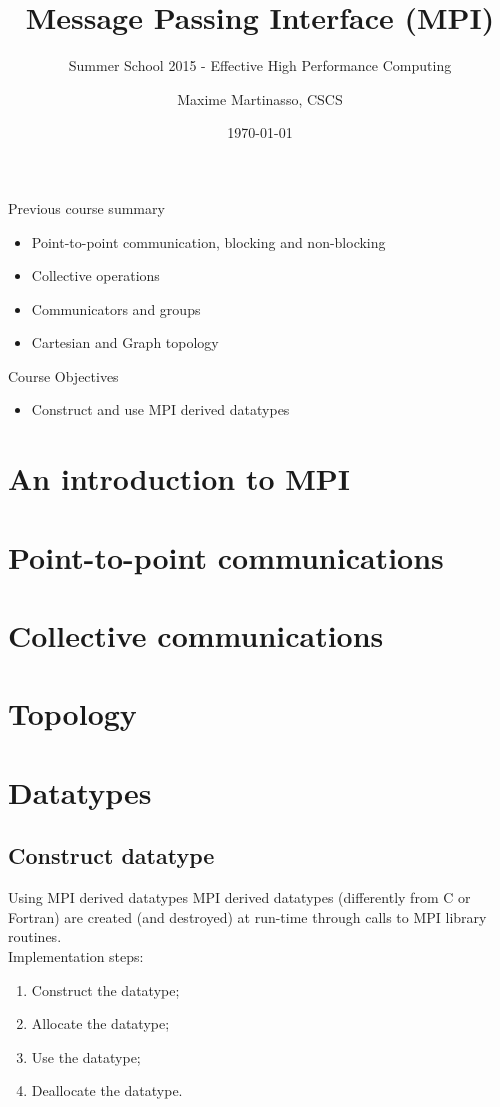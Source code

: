\documentclass[aspectratio=43]{beamer}
\author{Maxime Martinasso, CSCS}
\title{Message Passing Interface (MPI)}
\subtitle{Summer School 2015 - Effective High Performance Computing}
\date{\today}
\begin{document}
\cscstitle

\begin{frame}{Previous course summary}
\begin{itemize}
\item Point-to-point communication, blocking and non-blocking
\item Collective operations
\item Communicators and groups
\item Cartesian and Graph topology
\end{itemize}
\end{frame}

\begin{frame}{Course Objectives}
\begin{itemize}
\item Construct and use MPI derived datatypes
\end{itemize}
\end{frame}


\section{An introduction to MPI}
\section{Point-to-point communications}
\section{Collective communications}
\section{Topology}
\section{Datatypes}


\subsection{Construct datatype}

\begin{frame}[fragile]{Using MPI derived datatypes}
MPI derived datatypes (differently from C or Fortran) are created (and destroyed) at run-time through calls to MPI library routines.\\
Implementation steps:
\begin{enumerate}
\item Construct the datatype;
\item Allocate the datatype;
\item Use the datatype;
\item Deallocate the datatype.
\end{enumerate}
\end{frame}
\end{document}

